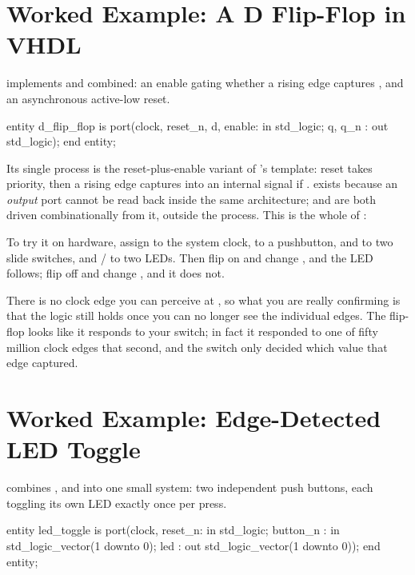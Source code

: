 \section{Worked Example: A D Flip-Flop in VHDL}
\label{c3:a8}
 implements  and 
combined: an enable gating whether a rising edge captures , and an asynchronous active-low
reset.

\begin{vhdlcode}
entity d_flip_flop is
    port(clock, reset_n, d, enable: in std_logic;
         q, q_n                   : out std_logic);
end entity;
\end{vhdlcode}

\noindent Its single process is the reset-plus-enable variant of 's template: reset
takes priority, then a rising edge captures  into an internal signal  if
.  exists because an \emph{output} port cannot be read back inside the
same architecture;  and  are both driven combinationally from it, outside the
process. This is the whole of :


To try it on hardware, assign  to the  system clock,  to a
pushbutton,  and  to two slide switches, and / to two LEDs.
Then flip  on and change , and the LED follows; flip  off and change
, and it does not.

There is no clock edge you can perceive at , so what you are really confirming is that
the logic still holds once you can no longer see the individual edges. The flip-flop looks like it
responds to your switch; in fact it responded to one of fifty million clock edges that second, and
the switch only decided which value that edge captured.

\section{Worked Example: Edge-Detected LED Toggle}
\label{c3:a9}
 combines ,  and
 into one small system: two independent push buttons, each toggling its own LED
exactly once per press.

\begin{vhdlcode}
entity led_toggle is
    port(clock, reset_n: in std_logic;
         button_n      : in std_logic_vector(1 downto 0);
         led           : out std_logic_vector(1 downto 0));
end entity;
\end{vhdlcode}

